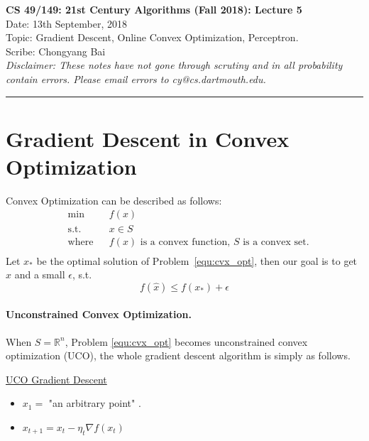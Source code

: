 \documentclass[11pt]{article}
\begin{document}
	\begin{center}
		{\bf \Large CS 49/149: 21st Century Algorithms (Fall 2018): Lecture 5}\\ 
		Date: 13th September, 2018 \\
		Topic: Gradient Descent, Online Convex Optimization, Perceptron.
		\\
		Scribe: Chongyang Bai \\
		{\em Disclaimer: These notes have not gone through scrutiny and in all probability contain errors. Please email errors to cy@cs.dartmouth.edu.}
	\end{center}
\hrule height 2pt
\vspace{3ex}
\def\loss{\mathsf{loss}}
\newcommand{\norm}[1]{||#1||}
\section{Gradient Descent in Convex Optimization}
Convex Optimization can be described as follows:
\begin{equation}
\begin{aligned}
& \min & & f(x) \\
& \text{s.t.} & & x \in S \\
& \text{where} & & f(x) \text{ is a convex function, } S \text{ is a convex set.} \\
\end{aligned}
\label{equ:cvx_opt}
\end{equation}
Let $x_*$ be the optimal solution of Problem~\ref{equ:cvx_opt}, then our goal is to get $\hat{x}$ and a small $\epsilon$, s.t. 
\begin{equation} 
f(\hat{x}) \leq f(x_*)+\epsilon
\end{equation}
\paragraph{Unconstrained Convex Optimization.}
When $S = \mathbb{R}^n$, Problem \ref{equ:cvx_opt} becomes unconstrained convex optimization (UCO), the whole gradient descent algorithm is simply as follows.
\begin{mdframed}[backgroundcolor=blue!05,topline=false,bottomline=false,leftline=false,rightline=false] 
	\underline{\sc UCO Gradient Descent}
	\begin{itemize}
		\item $x_1 = $ "an arbitrary point" .
		\item $x_{t+1} = x_t - \eta_{t}\nabla f(x_t)$
	\end{itemize}
\end{mdframed}
\end{document}
